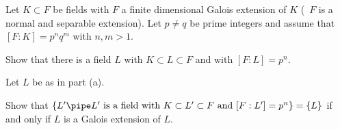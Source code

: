 Let $K\subset F$ be fields with $F$ a finite dimensional Galois
extension of $K$ (\ie\ $F$ is a normal and separable extension). Let
$p\neq q$ be prime integers and assume that $[F:K]=p^nq^m$ with
$n,m>1$.
\begin{alist}
\item Show that there is a field $L$ with $K\subset L\subset F$ and
with $[F:L]=p^n$.
\item Let $L$ be as in part (a).

Show that $\{L' \pipe L' \text{\ is a field with\ } K\subset L'\subset
F \text{\ and\ } [F:L']=p^n\}=\{L\}$ if and only if $L$ is a Galois
extension of $L$.
\end{alist}

